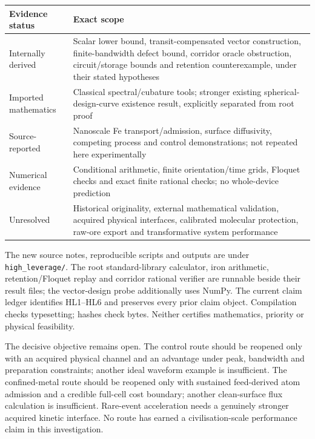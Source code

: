 \documentclass[11pt]{article}
\begin{document}
\begin{center}\small
\begin{tabular}{p{.20\linewidth}p{.68\linewidth}}
\toprule
Evidence status & Exact scope\\
\midrule
Internally derived & Scalar lower bound, transit-compensated vector construction,
finite-bandwidth defect bound, corridor oracle obstruction, circuit/storage
bounds and retention counterexample, under their stated hypotheses\\
Imported mathematics & Classical spectral/cubature tools; stronger existing
spherical-design-curve existence result, explicitly separated from root proof\\
Source-reported & Nanoscale Fe transport/admission, surface diffusivity,
competing process and control demonstrations; not repeated here experimentally\\
Numerical evidence & Conditional arithmetic, finite orientation/time grids,
Floquet checks and exact finite rational checks; no whole-device prediction\\
Unresolved & Historical originality, external mathematical validation, acquired
physical interfaces, calibrated molecular protection, raw-ore export and
transformative system performance\\
\bottomrule
\end{tabular}
\end{center}

The new source notes, reproducible scripts and outputs are under
\texttt{high\_leverage/}. The root standard-library calculator, iron arithmetic,
retention/Floquet replay and corridor rational verifier are runnable beside their
result files; the vector-design probe additionally uses NumPy.
The current claim ledger identifies HL1--HL6 and preserves every prior claim
object. Compilation checks typesetting; hashes check bytes. Neither certifies
mathematics, priority or physical feasibility.

The decisive objective remains open. The control route should be reopened only
with an acquired physical channel and an advantage under peak, bandwidth and
preparation constraints; another ideal waveform example is insufficient.
The confined-metal route should be reopened only with sustained feed-derived
atom admission and a credible full-cell cost boundary; another clean-surface
flux calculation is insufficient. Rare-event acceleration needs a genuinely
stronger acquired kinetic interface. No route has earned a civilisation-scale
performance claim in this investigation.
\end{document}
